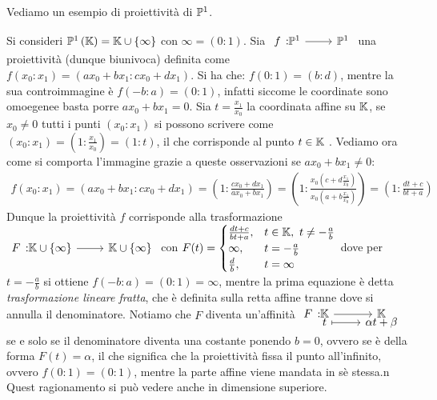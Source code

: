 Vediamo un esempio di proiettività di $\proj[1]{\ }$.
\begin{example}
	Si consideri $\proj[1]{\kamp} = \kamp \cup \{\infty\}$ con $\infty=(0\colon 1)$. Sia $\funz f {\proj[1]{\ }} {\proj[1]{\ }}$ una proiettività (dunque biunivoca) definita come $f(x_0\colon x_1)=(ax_0+bx_1\colon cx_0+dx_1)$. Si ha che: $f(0\colon 1)=(b\colon d)$, mentre la sua controimmagine è $f(-b\colon a)=(0\colon 1)$, infatti siccome le coordinate sono omoegenee basta porre $ax_0+bx_1=0$.\newline
	Sia $t=\frac{x_1}{x_0}$ la coordinata affine su $\mathbb{K}$, se $x_0\neq 0$ tutti i punti $(x_0\colon x_1)$ si possono scrivere come $(x_0\colon x_1)=\left( 1\colon \frac{x_1}{x_0} \right)=(1\colon t)$, il che corrisponde al punto $t\in\mathbb{K}$ . Vediamo ora come si comporta l'immagine grazie a queste osservazioni se $ax_0+bx_1\neq 0$:
		\begin{gather*}
			f(x_0\colon x_1)=(ax_0+bx_1\colon cx_0+dx_1)= \left( 1\colon \frac{cx_0+dx_1}{ax_0+bx_1} \right)  =  \left( 1 \colon  \frac{ x_0 \left( c+ d \frac{x_1}{x_0} \right) }{ x_0 \left( a+ b\frac{ x_1 }{ x_0 } \right)} \right)=\left( 1\colon \frac{dt+c}{bt+a}\right)
		\end{gather*}
	Dunque la proiettività $f$ corrisponde alla trasformazione $\funz F {\kamp\cup \{\infty\}} {\kamp\cup \{\infty\}}$ con $F(t)=\begin{cases}
		\frac{dt+c}{bt+a}, & t\in\mathbb{K}, \ t\neq -\frac{a}{b}\\
		\infty, & t=-\frac{a}{b}\\
		\frac{d}{b}, & t=\infty
				\end{cases}$
	dove per $t=-\frac{a}{b}$ si ottiene $f(-b\colon a)=(0\colon 1)=\infty$, mentre la prima equazione è detta \textit{trasformazione lineare fratta}, che è definita sulla retta affine tranne dove si annulla il denominatore. \newline
	Notiamo che $F$ diventa un'affinità $\funztot F \kamp \kamp t {\alpha t+\beta}$ se e solo se il denominatore diventa una costante ponendo $b=0$, ovvero se è della forma $F(t)=\alpha$, il che significa che la proiettività fissa il punto all'infinito, ovvero $f(0\colon 1)=(0\colon 1)$, mentre la parte affine viene mandata in sè stessa.n\newline 
	Quest ragionamento si può vedere anche in dimensione superiore.
\end{example}

